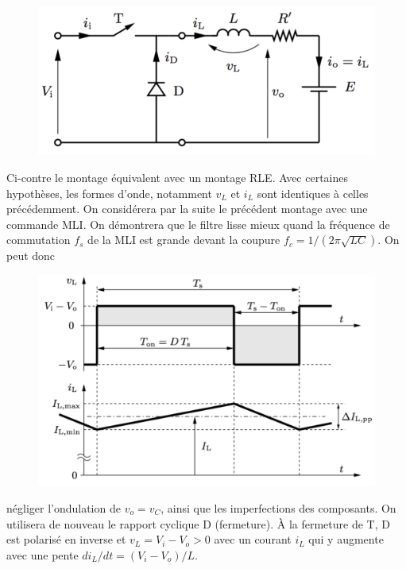 		\ \\\\
		 		
		\begin{figure}
		\vspace{-5mm}
		\includegraphics[scale=0.3]{ch5/3}
		\end{figure}	
		Ci-contre le montage équivalent avec un montage RLE. Avec certaines hypothèses, les formes d'onde, notamment $v_L$ et $i_L$ sont identiques à celles précédemment. On considérera par la suite le précédent montage avec une commande MLI. On démontrera que le filtre lisse mieux quand la fréquence de commutation $f_s$ de la MLI est grande devant la coupure $f_c = 1/(2\pi\sqrt{LC})$. On peut donc 
		
		\begin{figure}
		\vspace{-5mm}
		\includegraphics[scale=0.3]{ch5/4}
		\end{figure}	
		négliger l'ondulation de $v_o = v_C$, ainsi que les imperfections des composants. On utilisera de nouveau le rapport cyclique D (fermeture). À la fermeture de T, D est polarisé en inverse et $v_L = V_i - V_o>0$ avec un courant $i_L$ qui y augmente avec une pente $di_L/dt = (V_i -V_o)/L$.  
		
